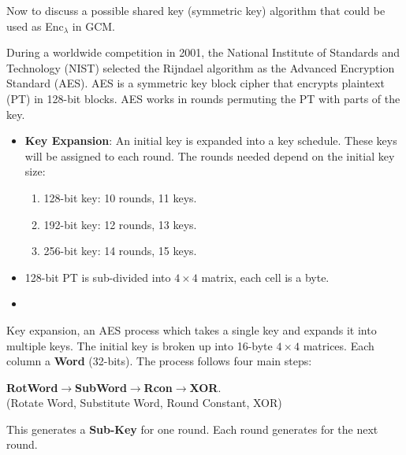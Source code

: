 Now to discuss a possible shared key (symmetric key) algorithm that could be used as Enc$_\lambda$ in GCM.
\begin{Def}

    \label{theo:aes}
    During a worldwide competition in 2001, the National Institute of Standards and Technology (NIST) selected the Rijndael algorithm as the Advanced Encryption Standard (AES).
    AES is a symmetric key block cipher that encrypts plaintext (PT) in 128-bit blocks. AES works in rounds permuting the PT with parts of the key.
    \begin{itemize}
        \item \textbf{Key Expansion}: An initial key is expanded into a key schedule. These keys will be assigned to each round. 
        The rounds needed depend on the initial key size:
        \begin{enumerate}
            \item 128-bit key: 10 rounds, 11 keys.
            \item 192-bit key: 12 rounds, 13 keys.
            \item 256-bit key: 14 rounds, 15 keys.
        \end{enumerate}
        \item 128-bit PT is sub-divided into $4\times4$ matrix, each cell is a byte.
        \item 
    \end{itemize}
\end{Def}

\newpage 

\begin{Def}
    
        \label{theo:key_expansion}
        Key expansion, an AES process which takes a single key and expands it into multiple keys. The initial key 
        is broken up into 16-byte $4\times4$ matrices. Each column a \textbf{Word} (32-bits). The process follows 
        four main steps:
        \begin{center}
            \textbf{RotWord}$\rightarrow$\textbf{SubWord}$\rightarrow$\textbf{Rcon}$\rightarrow$\textbf{XOR}.\\
            (Rotate Word, Substitute Word, Round Constant, XOR)
        \end{center}
        
        \noindent
        This generates a \textbf{Sub-Key} for one round. Each round generates for the next round.
\end{Def}

